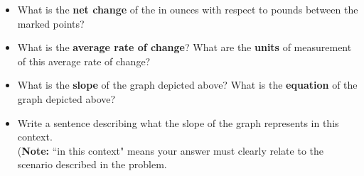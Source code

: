 \documentclass[12pt]{article}
\begin{document}
\begin{center}
\end{center}

    \begin{itemize}
    
    \item[(a)] What is the {\bf net change} of the in ounces with respect to pounds between the marked points?
    
    \item[(b)] What is the {\bf average rate of change}? What are the {\bf units} of measurement of this average rate of change? 
    
    \item[(c)] What is the {\bf slope} of the graph depicted above? What is the {\bf equation} of the graph depicted above?
    
    \item[(d)] Write a sentence describing what the slope of the graph represents in this context.\\ 
    ({\bf Note:} ``in this context" means your answer must clearly relate to the scenario described in the problem.
    \end{itemize}
\end{document}
